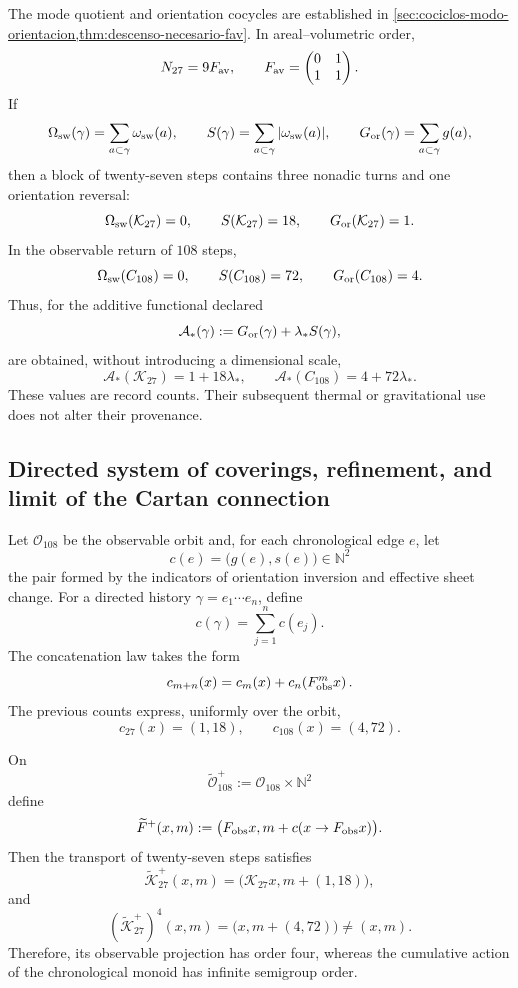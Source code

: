 The mode quotient and orientation cocycles are established in
\cref{sec:cociclos-modo-orientacion,thm:descenso-necesario-fav}. In areal--volumetric
order,
\[
 N_{27}=9F_{\rm av},
 \qquad
 F_{\rm av}=
 \begin{pmatrix}0&1\\1&1\end{pmatrix}.
\]
If
\[
 \Omega_{\rm sw}(\gamma)=\sum_{a\subset\gamma}\omega_{\rm sw}(a),
 \qquad
 S(\gamma)=\sum_{a\subset\gamma}|\omega_{\rm sw}(a)|,
 \qquad
 G_{\rm or}(\gamma)=\sum_{a\subset\gamma}g(a),
\]
then a block of twenty-seven steps contains three nonadic turns and one
orientation reversal:
\[
 \Omega_{\rm sw}(\mathcal K_{27})=0,\qquad
 S(\mathcal K_{27})=18,\qquad
 G_{\rm or}(\mathcal K_{27})=1.
\]
In the observable return of \(108\) steps,
\[
 \Omega_{\rm sw}(C_{108})=0,\qquad
 S(C_{108})=72,\qquad
 G_{\rm or}(C_{108})=4.
\]
Thus, for the additive functional declared
\[
 \mathcal A_\ast(\gamma)
 :=G_{\rm or}(\gamma)+\lambda_\ast S(\gamma),
\]
are obtained, without introducing a dimensional scale,
\[
 \mathcal A_\ast(\mathcal K_{27})=1+18\lambda_\ast,
 \qquad
 \mathcal A_\ast(C_{108})=4+72\lambda_\ast.
\]
These values are record counts. Their subsequent thermal or gravitational
use does not alter their provenance.

\subsection{Directed system of coverings, refinement, and limit of the Cartan connection}
\label{sec:cobertura-acumulativa-dirigida}

Let \(\mathcal O_{108}\) be the observable orbit and, for each chronological edge
\(e\), let
\[
 c(e)=\bigl(g(e),s(e)\bigr)\in\mathbb N^2
\]
the pair formed by the indicators of orientation inversion and effective
sheet change. For a directed history
\(\gamma=e_1\cdots e_n\), define
\[
 c(\gamma)=\sum_{j=1}^{n}c(e_j).
\]
The concatenation law takes the form
\[
 c_{m+n}(x)
 =c_m(x)+c_n\!\left(F_{\rm obs}^{m}x\right).
\]
The previous counts express, uniformly over the orbit,
\[
 c_{27}(x)=(1,18),
 \qquad
 c_{108}(x)=(4,72).
\]

\begin{theorem}
\label{thm:cobertura-acumulativa-dirigida}
On
\[
 \widetilde{\mathcal O}_{108}^{+}
 :=\mathcal O_{108}\times\mathbb N^2
\]
define
\[
 \widetilde F^{+}(x,m)
 :=\bigl(F_{\rm obs}x,m+c(x\to F_{\rm obs}x)\bigr).
\]
Then the transport of twenty-seven steps satisfies
\[
 \widetilde{\mathcal K}_{27}^{+}(x,m)
 =\bigl(\mathcal K_{27}x,m+(1,18)\bigr),
\]
and
\[
 \left(\widetilde{\mathcal K}_{27}^{+}\right)^4(x,m)
 =\bigl(x,m+(4,72)\bigr)\neq(x,m).
\]
Therefore, its observable projection has order four, whereas the
cumulative action of the chronological monoid has infinite semigroup order.
\end{theorem}

